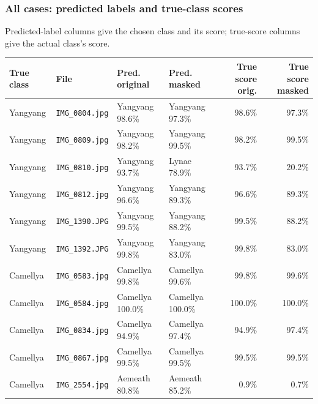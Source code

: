 \documentclass[11pt]{article}
\begin{document}
\subsubsection*{All cases: predicted labels and true-class scores}
Predicted-label columns give the chosen class and its score; true-score columns give the actual class's score.
\begin{center}\scriptsize
\setlength{\tabcolsep}{3pt}
\begin{tabular}{llllrr}
\toprule
True class & File & Pred. original & Pred. masked & True score orig. & True score masked \\
\midrule

Yangyang & \texttt{IMG\_0804.jpg} & Yangyang 98.6\% & Yangyang 97.3\% & 98.6\% & 97.3\% \\

Yangyang & \texttt{IMG\_0809.jpg} & Yangyang 98.2\% & Yangyang 99.5\% & 98.2\% & 99.5\% \\

Yangyang & \texttt{IMG\_0810.jpg} & Yangyang 93.7\% & Lynae 78.9\% & 93.7\% & 20.2\% \\

Yangyang & \texttt{IMG\_0812.jpg} & Yangyang 96.6\% & Yangyang 89.3\% & 96.6\% & 89.3\% \\

Yangyang & \texttt{IMG\_1390.JPG} & Yangyang 99.5\% & Yangyang 88.2\% & 99.5\% & 88.2\% \\

Yangyang & \texttt{IMG\_1392.JPG} & Yangyang 99.8\% & Yangyang 83.0\% & 99.8\% & 83.0\% \\

\midrule

Camellya & \texttt{IMG\_0583.jpg} & Camellya 99.8\% & Camellya 99.6\% & 99.8\% & 99.6\% \\

Camellya & \texttt{IMG\_0584.jpg} & Camellya 100.0\% & Camellya 100.0\% & 100.0\% & 100.0\% \\

Camellya & \texttt{IMG\_0834.jpg} & Camellya 94.9\% & Camellya 97.4\% & 94.9\% & 97.4\% \\

Camellya & \texttt{IMG\_0867.jpg} & Camellya 99.5\% & Camellya 99.5\% & 99.5\% & 99.5\% \\

Camellya & \texttt{IMG\_2554.jpg} & Aemeath 80.8\% & Aemeath 85.2\% & 0.9\% & 0.7\% \\


\end{tabular}
\end{center}
\end{document}
